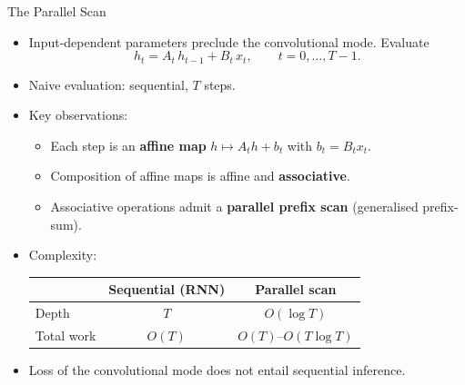 \begin{frame}{The Parallel Scan}

  \begin{itemize}
    \item Input-dependent parameters preclude the convolutional mode. Evaluate
      \[
        h_t = A_t\, h_{t-1} + B_t\, x_t, \qquad t = 0, \ldots, T{-}1.
      \]
    \item Naive evaluation: sequential, $T$ steps.
    \item Key observations:
      \begin{itemize}
        \item Each step is an \textbf{affine map} $h \mapsto A_t h + b_t$ with $b_t = B_t x_t$.
        \item Composition of affine maps is affine and \textbf{associative}.
        \item Associative operations admit a \textbf{parallel prefix scan} (generalised prefix-sum).
      \end{itemize}
    \item Complexity:
      \begin{center}
        \begin{tabular}{lcc}
          \toprule
          & \textbf{Sequential (RNN)} & \textbf{Parallel scan} \\
          \midrule
          Depth      & $T$    & $O(\log T)$ \\
          Total work & $O(T)$ & $O(T)$--$O(T\log T)$ \\
          \bottomrule
        \end{tabular}
      \end{center}
    \item Loss of the convolutional mode does not entail sequential inference.
  \end{itemize}
\end{frame}

